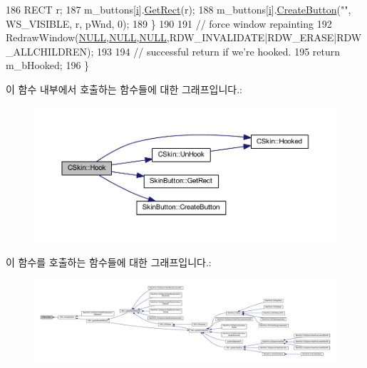 \begin{DoxyCode}
186     RECT r;
187     m\_buttons[\mbox{\hyperlink{expr-lex_8cpp_acb559820d9ca11295b4500f179ef6392}{i}}].\mbox{\hyperlink{class_skin_button_aef7f1ced23d060545eabd5b57175143a}{GetRect}}(r);
188     m\_buttons[\mbox{\hyperlink{expr-lex_8cpp_acb559820d9ca11295b4500f179ef6392}{i}}].\mbox{\hyperlink{class_skin_button_ad70dc6ed236a2274028c32744e3690bb}{CreateButton}}(\textcolor{stringliteral}{""}, WS\_VISIBLE, r, pWnd, 0);
189   \}
190   
191   \textcolor{comment}{// force window repainting}
192   RedrawWindow(\mbox{\hyperlink{getopt1_8c_a070d2ce7b6bb7e5c05602aa8c308d0c4}{NULL}},\mbox{\hyperlink{getopt1_8c_a070d2ce7b6bb7e5c05602aa8c308d0c4}{NULL}},\mbox{\hyperlink{getopt1_8c_a070d2ce7b6bb7e5c05602aa8c308d0c4}{NULL}},RDW\_INVALIDATE|RDW\_ERASE|RDW\_ALLCHILDREN);  
193 
194   \textcolor{comment}{// successful return if we're hooked.}
195   \textcolor{keywordflow}{return} m\_bHooked;
196 \}
\end{DoxyCode}
이 함수 내부에서 호출하는 함수들에 대한 그래프입니다.\+:
\nopagebreak
\begin{figure}[H]
\begin{center}
\leavevmode
\includegraphics[width=350pt]{class_c_skin_a4897349a9944fe2e2ee9cfdc4f0baf47_cgraph}
\end{center}
\end{figure}
이 함수를 호출하는 함수들에 대한 그래프입니다.\+:
\nopagebreak
\begin{figure}[H]
\begin{center}
\leavevmode
\includegraphics[width=350pt]{class_c_skin_a4897349a9944fe2e2ee9cfdc4f0baf47_icgraph}
\end{center}
\end{figure}
\mbox{\label{class_c_skin_a99b438d858bbafa83569f19e707ba3c9}} 
